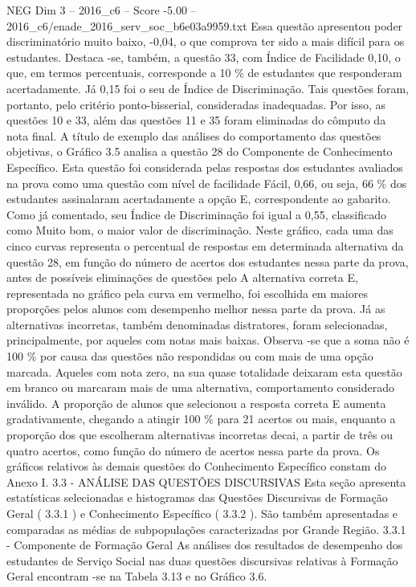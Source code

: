 \begin{textsample}{NEG Dim 3 – 2016\_c6 – Score -5.00 – 2016\_c6/enade\_2016\_serv\_soc\_b6e03a9959.txt}
Essa questão apresentou poder discriminatório muito baixo, -0,04, o que comprova ter sido a mais difícil para os estudantes.
Destaca -se, também, a questão 33, com Índice de Facilidade 0,10, o que, em termos percentuais, corresponde a 10 \% de estudantes que responderam acertadamente.
Já 0,15 foi o seu de Índice de Discriminação.
Tais questões foram, portanto, pelo critério ponto-bisserial, consideradas inadequadas.
Por isso, as questões 10 e 33, além das questões 11 e 35 foram eliminadas do cômputo da nota final.
A título de exemplo das análises do comportamento das questões objetivas, o Gráfico 3.5 analisa a questão 28 do Componente de Conhecimento Específico.
Esta questão foi considerada pelas respostas dos estudantes avaliados na prova como uma questão com nível de facilidade Fácil, 0,66, ou seja, 66 \% dos estudantes assinalaram acertadamente a opção E, correspondente ao gabarito.
Como já comentado, seu Índice de Discriminação foi igual a 0,55, classificado como Muito bom, o maior valor de discriminação.
Neste gráfico, cada uma das cinco curvas representa o percentual de respostas em determinada alternativa da questão 28, em função do número de acertos dos estudantes nessa parte da prova, antes de possíveis eliminações de questões pelo A alternativa correta E, representada no gráfico pela curva em vermelho, foi escolhida em maiores proporções pelos alunos com desempenho melhor nessa parte da prova.
Já as alternativas incorretas, também denominadas distratores, foram selecionadas, principalmente, por aqueles com notas mais baixas.
Observa -se que a soma não é 100 \% por causa das questões não respondidas ou com mais de uma opção marcada.
Aqueles com nota zero, na sua quase totalidade deixaram esta questão em branco ou marcaram mais de uma alternativa, comportamento considerado inválido.
A proporção de alunos que selecionou a resposta correta E aumenta gradativamente, chegando a atingir 100 \% para 21 acertos ou mais, enquanto a proporção dos que escolheram alternativas incorretas decai, a partir de três ou quatro acertos, como função do número de acertos nessa parte da prova.
Os gráficos relativos às demais questões do Conhecimento Específico constam do Anexo I. 3.3 - ANÁLISE DAS QUESTÕES DISCURSIVAS Esta seção apresenta estatísticas selecionadas e histogramas das Questões Discursivas de Formação Geral ( 3.3.1 ) e Conhecimento Específico ( 3.3.2 ).
São também apresentadas e comparadas as médias de subpopulações caracterizadas por Grande Região. 3.3.1 - Componente de Formação Geral As análises dos resultados de desempenho dos estudantes de Serviço Social nas duas questões discursivas relativas à Formação Geral encontram -se na Tabela 3.13 e no Gráfico 3.6.

\end{textsample}
